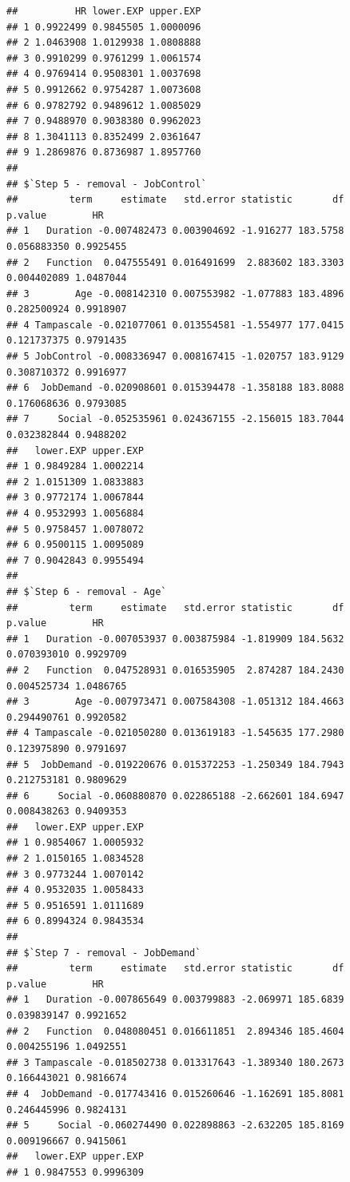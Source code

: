 \documentclass[
]{book}
\begin{document}
\begin{verbatim}
##          HR lower.EXP upper.EXP
## 1 0.9922499 0.9845505 1.0000096
## 2 1.0463908 1.0129938 1.0808888
## 3 0.9910299 0.9761299 1.0061574
## 4 0.9769414 0.9508301 1.0037698
## 5 0.9912662 0.9754287 1.0073608
## 6 0.9782792 0.9489612 1.0085029
## 7 0.9488970 0.9038380 0.9962023
## 8 1.3041113 0.8352499 2.0361647
## 9 1.2869876 0.8736987 1.8957760
## 
## $`Step 5 - removal - JobControl`
##         term     estimate   std.error statistic       df     p.value        HR
## 1   Duration -0.007482473 0.003904692 -1.916277 183.5758 0.056883350 0.9925455
## 2   Function  0.047555491 0.016491699  2.883602 183.3303 0.004402089 1.0487044
## 3        Age -0.008142310 0.007553982 -1.077883 183.4896 0.282500924 0.9918907
## 4 Tampascale -0.021077061 0.013554581 -1.554977 177.0415 0.121737375 0.9791435
## 5 JobControl -0.008336947 0.008167415 -1.020757 183.9129 0.308710372 0.9916977
## 6  JobDemand -0.020908601 0.015394478 -1.358188 183.8088 0.176068636 0.9793085
## 7     Social -0.052535961 0.024367155 -2.156015 183.7044 0.032382844 0.9488202
##   lower.EXP upper.EXP
## 1 0.9849284 1.0002214
## 2 1.0151309 1.0833883
## 3 0.9772174 1.0067844
## 4 0.9532993 1.0056884
## 5 0.9758457 1.0078072
## 6 0.9500115 1.0095089
## 7 0.9042843 0.9955494
## 
## $`Step 6 - removal - Age`
##         term     estimate   std.error statistic       df     p.value        HR
## 1   Duration -0.007053937 0.003875984 -1.819909 184.5632 0.070393010 0.9929709
## 2   Function  0.047528931 0.016535905  2.874287 184.2430 0.004525734 1.0486765
## 3        Age -0.007973471 0.007584308 -1.051312 184.4663 0.294490761 0.9920582
## 4 Tampascale -0.021050280 0.013619183 -1.545635 177.2980 0.123975890 0.9791697
## 5  JobDemand -0.019220676 0.015372253 -1.250349 184.7943 0.212753181 0.9809629
## 6     Social -0.060880870 0.022865188 -2.662601 184.6947 0.008438263 0.9409353
##   lower.EXP upper.EXP
## 1 0.9854067 1.0005932
## 2 1.0150165 1.0834528
## 3 0.9773244 1.0070142
## 4 0.9532035 1.0058433
## 5 0.9516591 1.0111689
## 6 0.8994324 0.9843534
## 
## $`Step 7 - removal - JobDemand`
##         term     estimate   std.error statistic       df     p.value        HR
## 1   Duration -0.007865649 0.003799883 -2.069971 185.6839 0.039839147 0.9921652
## 2   Function  0.048080451 0.016611851  2.894346 185.4604 0.004255196 1.0492551
## 3 Tampascale -0.018502738 0.013317643 -1.389340 180.2673 0.166443021 0.9816674
## 4  JobDemand -0.017743416 0.015260646 -1.162691 185.8081 0.246445996 0.9824131
## 5     Social -0.060274490 0.022898863 -2.632205 185.8169 0.009196667 0.9415061
##   lower.EXP upper.EXP
## 1 0.9847553 0.9996309

\end{verbatim}
\end{document}
